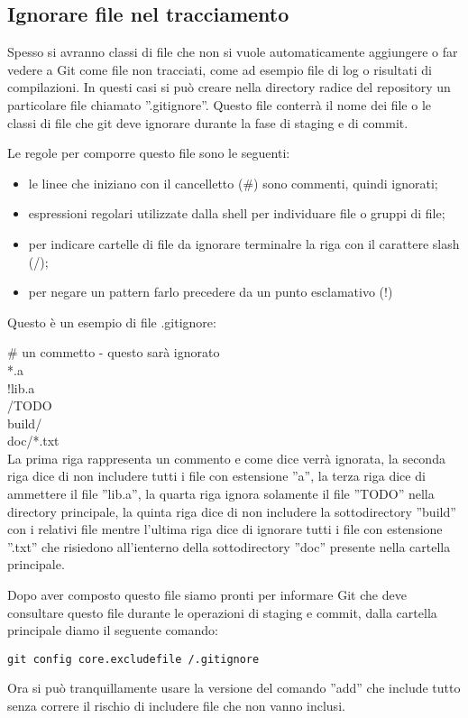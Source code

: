 \subsection{Ignorare file nel tracciamento}
Spesso si avranno classi di file che non si vuole automaticamente aggiungere o far vedere a Git come file non tracciati, come ad esempio file di log o risultati di compilazioni. In questi casi si può creare nella directory radice del repository un particolare file chiamato ''.gitignore''. Questo file conterrà il nome dei file o le classi di file che git deve ignorare durante la fase di staging e di commit.

Le regole per comporre questo file sono le seguenti:

\begin{itemize}
\item le linee che iniziano con il cancelletto (\#)  sono commenti, quindi ignorati;
\item espressioni regolari utilizzate dalla shell per individuare file o gruppi di file;
\item per indicare cartelle di file da ignorare terminalre la riga con il carattere slash (/);
\item per negare un pattern farlo precedere da un punto esclamativo (!)
\end{itemize}

Questo è un esempio di file .gitignore:

\# un commetto - questo sarà ignorato\\
*.a\\
!lib.a\\
/TODO\\
build/\\
doc/*.txt\\

La prima riga rappresenta un commento e come dice verrà ignorata, la seconda riga dice di non includere tutti i file con estensione ''a'', la terza riga dice di ammettere il file ''lib.a'', la quarta riga ignora solamente il file ''TODO'' nella directory principale, la quinta riga dice di non includere la sottodirectory ''build'' con i relativi file mentre l'ultima riga dice di ignorare tutti i file con estensione ''.txt'' che risiedono all'ienterno della sottodirectory ''doc'' presente nella cartella principale.

Dopo aver composto questo file siamo pronti per informare Git che deve consultare questo file durante le operazioni di staging e commit, dalla cartella principale diamo il seguente comando:

\begin{center}
\texttt{git config core.excludefile /.gitignore}
\end{center}

Ora si può tranquillamente usare la versione del comando ''add'' che include tutto senza correre il rischio di includere file che non vanno inclusi.
